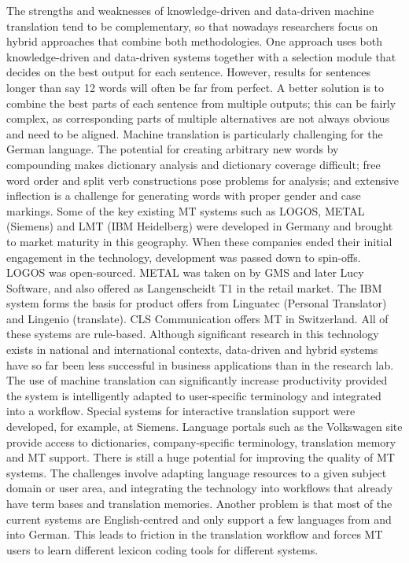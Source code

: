 \documentclass[]{../metanetpaper}
\begin{document}
The strengths and weaknesses of knowledge-driven and data-driven machine translation tend to be complementary, so that nowadays researchers focus on hybrid approaches that combine both methodologies. One approach uses both knowledge-driven and data-driven systems together with a selection module that decides on the best output for each sentence. However, results for sentences longer than say 12 words will often be far from perfect. A better solution is to combine the best parts of each sentence from multiple outputs; this can be fairly complex, as corresponding parts of multiple alternatives are not always obvious and need to be aligned. 
Machine translation is particularly challenging for the German language. The potential for creating arbitrary new words by compounding makes dictionary analysis and dictionary coverage difficult; free word order and split verb constructions pose problems for analysis; and extensive inflection is a challenge for generating words with proper gender and case markings. 
Some of the key existing MT systems such as LOGOS, METAL (Siemens) and LMT (IBM Heidelberg) were developed in Germany and brought to market maturity in this geography. When these companies ended their initial engagement in the technology, development was passed down to spin-offs. LOGOS was open-sourced. METAL was taken on by GMS and later Lucy Software, and also offered as Langenscheidt T1 in the retail market. The IBM system forms the basis for product offers from Linguatec (Personal Translator) and Lingenio (translate). CLS Communication offers MT in Switzerland. All of these systems are rule-based. Although significant research in this technology exists in national and international contexts, data-driven and hybrid systems have so far been less successful in business applications than in the research lab. 
The use of machine translation can significantly increase productivity provided the system is intelligently adapted to user-specific terminology and integrated into a workflow. Special systems for interactive translation support were developed, for example, at Siemens. Language portals such as the Volkswagen site provide access to dictionaries, company-specific terminology, translation memory and MT support. 
There is still a huge potential for improving the quality of MT systems. The challenges involve adapting language resources to a given subject domain or user area, and integrating the technology into workflows that already have term bases and translation memories. Another problem is that most of the current systems are English-centred and only support a few languages from and into German. This leads to friction in the translation workflow and forces MT users to learn different lexicon coding tools for different systems.
\end{document}

